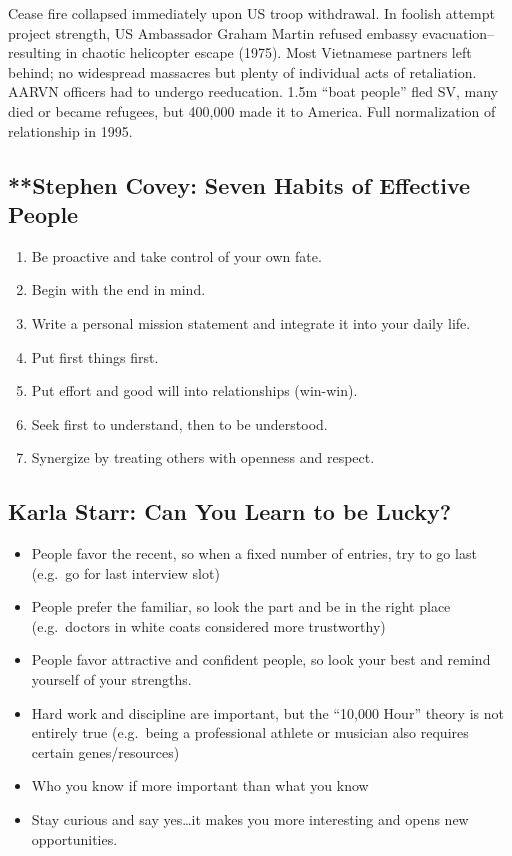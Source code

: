 \documentclass[
]{article}
\begin{document}
Cease fire collapsed immediately upon US troop withdrawal. In foolish
attempt project strength, US Ambassador Graham Martin refused embassy
evacuation--resulting in chaotic helicopter escape (1975). Most
Vietnamese partners left behind; no widespread massacres but plenty of
individual acts of retaliation. AARVN officers had to undergo
reeducation. 1.5m ``boat people'' fled SV, many died or became refugees,
but 400,000 made it to America. Full normalization of relationship in
1995.

\hypertarget{stephen-covey-seven-habits-of-effective-people}{%
\subsection{**Stephen Covey: Seven Habits of Effective
People}\label{stephen-covey-seven-habits-of-effective-people}}

\begin{enumerate}
\def\labelenumi{\arabic{enumi}.}
\item
  Be proactive and take control of your own fate.
\item
  Begin with the end in mind.
\item
  Write a personal mission statement and integrate it into your daily
  life.
\item
  Put first things first.
\item
  Put effort and good will into relationships (win-win).
\item
  Seek first to understand, then to be understood.
\item
  Synergize by treating others with openness and respect.
\end{enumerate}

\hypertarget{karla-starr-can-you-learn-to-be-lucky}{%
\subsection{Karla Starr: Can You Learn to be
Lucky?}\label{karla-starr-can-you-learn-to-be-lucky}}

\begin{itemize}
\item
  People favor the recent, so when a fixed number of entries, try to go
  last (e.g.~go for last interview slot)
\item
  People prefer the familiar, so look the part and be in the right place
  (e.g.~doctors in white coats considered more trustworthy)
\item
  People favor attractive and confident people, so look your best and
  remind yourself of your strengths.
\item
  Hard work and discipline are important, but the ``10,000 Hour'' theory
  is not entirely true (e.g.~being a professional athlete or musician
  also requires certain genes/resources)
\item
  Who you know if more important than what you know
\item
  Stay curious and say yes\ldots it makes you more interesting and opens
  new opportunities.
\end{itemize}
\end{document}
